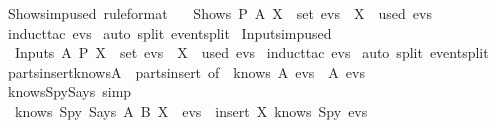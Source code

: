 \begin{isabellebody}
  \isamarkupfalse%
  \endisatagproof
  {\isafoldproof}%
  \isadelimproof
  \isanewline
  \endisadelimproof
  \isanewline
  \isamarkupfalse%
  \ Shows{\isacharunderscore}imp{\isacharunderscore}used\ {\isacharbrackleft}rule{\isacharunderscore}format{\isacharbrackright}\ {\isacharcolon}\isanewline
  \ \ {\isachardoublequoteopen}Shows\ P\ A\ X\ {\isasymin}\ set\ evs\ {\isasymlongrightarrow}\ X\ {\isasymin}\ used\ evs{\isachardoublequoteclose}\isanewline
  \isadelimproof
  \endisadelimproof
  \isatagproof
  \isamarkupfalse%
  \ {\isacharparenleft}induct{\isacharunderscore}tac\ evs{\isacharparenright}\isanewline
  \isamarkupfalse%
  \ {\isacharparenleft}auto\ split{\isacharcolon}\ event{\isachardot}split{\isacharparenright}\isanewline
  \isamarkupfalse%
  \endisatagproof
  {\isafoldproof}%
  \isadelimproof
  \isanewline
  \endisadelimproof
  \isanewline
  \isamarkupfalse%
  \ Inputs{\isacharunderscore}imp{\isacharunderscore}used\ {\isacharcolon}\isanewline
  \ \ {\isachardoublequoteopen}Inputs\ A\ P\ X\ {\isasymin}\ set\ evs\ {\isasymlongrightarrow}\ X\ {\isasymin}\ used\ evs{\isachardoublequoteclose}\isanewline
  \isadelimproof
  \endisadelimproof
  \isatagproof
  \isamarkupfalse%
  \ {\isacharparenleft}induct{\isacharunderscore}tac\ evs{\isacharparenright}\isanewline
  \isamarkupfalse%
  \ {\isacharparenleft}auto\ split{\isacharcolon}\ event{\isachardot}split{\isacharparenright}\isanewline
  \isamarkupfalse%
  \endisatagproof
  {\isafoldproof}%
  \isadelimproof
  \endisadelimproof
  \isadelimdocument
  \endisadelimdocument
  \isatagdocument
  \isamarkuptrue%
  \endisatagdocument
  {\isafolddocument}%
  \isadelimdocument
  \endisadelimdocument
  \isamarkupfalse%
  \ parts{\isacharunderscore}insert{\isacharunderscore}knows{\isacharunderscore}A\ {\isacharequal}\ parts{\isacharunderscore}insert\ {\isacharbrackleft}of\ {\isacharunderscore}\ {\isachardoublequoteopen}knows\ A\ evs{\isachardoublequoteclose}{\isacharbrackright}\ \ A\ evs\isanewline
  \isanewline
  \isamarkupfalse%
  \ knows{\isacharunderscore}Spy{\isacharunderscore}Says\ {\isacharbrackleft}simp{\isacharbrackright}\ {\isacharcolon}\isanewline
  \ \ {\isachardoublequoteopen}knows\ Spy\ {\isacharparenleft}Says\ A\ B\ X\ {\isacharhash}\ evs{\isacharparenright}\ {\isacharequal}\ insert\ X\ {\isacharparenleft}knows\ Spy\ evs{\isacharparenright}{\isachardoublequoteclose}\isanewline

\end{isabellebody}
